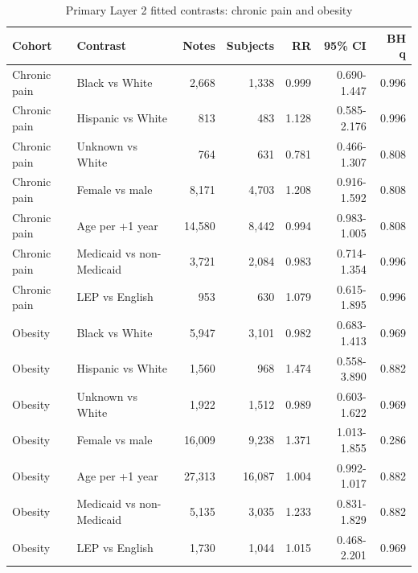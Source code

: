 \documentclass[unnumsec,webpdf,contemporary,large]{oup-authoring-template}
\begin{document}
\begin{table}[H]
\caption{Primary Layer 2 fitted contrasts: chronic pain and obesity}
\label{tab:s_layer2b}
\centering
\small
\begin{tabular}{llrrrrr}
\toprule
Cohort & Contrast & Notes & Subjects & RR & 95\% CI & BH q \\
\midrule
Chronic pain & Black vs White & 2,668 & 1,338 & 0.999 & 0.690-1.447 & 0.996 \\
Chronic pain & Hispanic vs White & 813 & 483 & 1.128 & 0.585-2.176 & 0.996 \\
Chronic pain & Unknown vs White & 764 & 631 & 0.781 & 0.466-1.307 & 0.808 \\
Chronic pain & Female vs male & 8,171 & 4,703 & 1.208 & 0.916-1.592 & 0.808 \\
Chronic pain & Age per +1 year & 14,580 & 8,442 & 0.994 & 0.983-1.005 & 0.808 \\
Chronic pain & Medicaid vs non-Medicaid & 3,721 & 2,084 & 0.983 & 0.714-1.354 & 0.996 \\
Chronic pain & LEP vs English & 953 & 630 & 1.079 & 0.615-1.895 & 0.996 \\
Obesity & Black vs White & 5,947 & 3,101 & 0.982 & 0.683-1.413 & 0.969 \\
Obesity & Hispanic vs White & 1,560 & 968 & 1.474 & 0.558-3.890 & 0.882 \\
Obesity & Unknown vs White & 1,922 & 1,512 & 0.989 & 0.603-1.622 & 0.969 \\
Obesity & Female vs male & 16,009 & 9,238 & 1.371 & 1.013-1.855 & 0.286 \\
Obesity & Age per +1 year & 27,313 & 16,087 & 1.004 & 0.992-1.017 & 0.882 \\
Obesity & Medicaid vs non-Medicaid & 5,135 & 3,035 & 1.233 & 0.831-1.829 & 0.882 \\
Obesity & LEP vs English & 1,730 & 1,044 & 1.015 & 0.468-2.201 & 0.969 \\
\bottomrule
\end{tabular}
\end{table}
\end{document}
